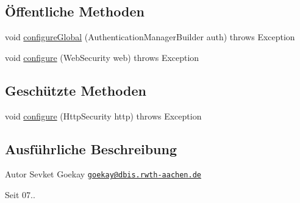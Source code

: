 \subsection*{Öffentliche Methoden}
\begin{DoxyCompactItemize}
\item 
void \hyperlink{classde_1_1rwth_1_1idsg_1_1steve_1_1config_1_1_security_configuration_a11551d00b67af53ba2c5a03adf39eb42}{configure\-Global} (Authentication\-Manager\-Builder auth)  throws Exception 
\item 
void \hyperlink{classde_1_1rwth_1_1idsg_1_1steve_1_1config_1_1_security_configuration_a12902bde87c1a8b0abfeed16c439c1c6}{configure} (Web\-Security web)  throws Exception 
\end{DoxyCompactItemize}
\subsection*{Geschützte Methoden}
\begin{DoxyCompactItemize}
\item 
void \hyperlink{classde_1_1rwth_1_1idsg_1_1steve_1_1config_1_1_security_configuration_ab2e9f208474e7b2068ff87e3e9b4332e}{configure} (Http\-Security http)  throws Exception 
\end{DoxyCompactItemize}


\subsection{Ausführliche Beschreibung}
\begin{DoxyAuthor}{Autor}
Sevket Goekay \href{mailto:goekay@dbis.rwth-aachen.de}{\tt goekay@dbis.\-rwth-\/aachen.\-de} 
\end{DoxyAuthor}
\begin{DoxySince}{Seit}
07.. 
\end{DoxySince}


